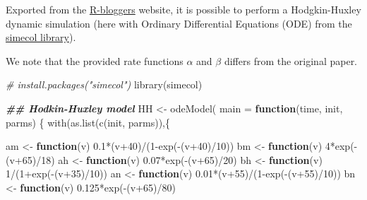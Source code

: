 \documentclass[
]{article}
\newenvironment{Shaded}{\begin{snugshade}}{\end{snugshade}}
\newcommand{\AttributeTok}[1]{\textcolor[rgb]{0.77,0.63,0.00}{#1}}
\newcommand{\CommentTok}[1]{\textcolor[rgb]{0.56,0.35,0.01}{\textit{#1}}}
\newcommand{\ControlFlowTok}[1]{\textcolor[rgb]{0.13,0.29,0.53}{\textbf{#1}}}
\newcommand{\DecValTok}[1]{\textcolor[rgb]{0.00,0.00,0.81}{#1}}
\newcommand{\DocumentationTok}[1]{\textcolor[rgb]{0.56,0.35,0.01}{\textbf{\textit{#1}}}}
\newcommand{\FloatTok}[1]{\textcolor[rgb]{0.00,0.00,0.81}{#1}}
\newcommand{\FunctionTok}[1]{\textcolor[rgb]{0.00,0.00,0.00}{#1}}
\newcommand{\NormalTok}[1]{#1}
\newcommand{\OtherTok}[1]{\textcolor[rgb]{0.56,0.35,0.01}{#1}}
\newcommand{\SpecialCharTok}[1]{\textcolor[rgb]{0.00,0.00,0.00}{#1}}
\begin{document}
Exported from the
\href{https://www.r-bloggers.com/2012/06/hodgkin-huxley-model-in-r/}{R-bloggers}
website, it is possible to perform a Hodgkin-Huxley dynamic simulation
(here with Ordinary Differential Equations (ODE) from the
\href{http://simecol.r-forge.r-project.org/}{simecol library}).

We note that the provided rate functions \(\alpha\) and \(\beta\)
differs from the original paper.

\begin{Shaded}
\begin{Highlighting}[]
\CommentTok{\# install.packages("simecol")}
\FunctionTok{library}\NormalTok{(simecol)}
\end{Highlighting}
\end{Shaded}

\begin{Shaded}
\begin{Highlighting}[]
\DocumentationTok{\#\# Hodkin{-}Huxley model}
\NormalTok{HH }\OtherTok{\textless{}{-}} \FunctionTok{odeModel}\NormalTok{(}
\AttributeTok{main =} \ControlFlowTok{function}\NormalTok{(time, init, parms) \{}
  \FunctionTok{with}\NormalTok{(}\FunctionTok{as.list}\NormalTok{(}\FunctionTok{c}\NormalTok{(init, parms)),\{}

\NormalTok{    am }\OtherTok{\textless{}{-}} \ControlFlowTok{function}\NormalTok{(v) }\FloatTok{0.1}\SpecialCharTok{*}\NormalTok{(v}\SpecialCharTok{+}\DecValTok{40}\NormalTok{)}\SpecialCharTok{/}\NormalTok{(}\DecValTok{1}\SpecialCharTok{{-}}\FunctionTok{exp}\NormalTok{(}\SpecialCharTok{{-}}\NormalTok{(v}\SpecialCharTok{+}\DecValTok{40}\NormalTok{)}\SpecialCharTok{/}\DecValTok{10}\NormalTok{))}
\NormalTok{    bm }\OtherTok{\textless{}{-}} \ControlFlowTok{function}\NormalTok{(v) }\DecValTok{4}\SpecialCharTok{*}\FunctionTok{exp}\NormalTok{(}\SpecialCharTok{{-}}\NormalTok{(v}\SpecialCharTok{+}\DecValTok{65}\NormalTok{)}\SpecialCharTok{/}\DecValTok{18}\NormalTok{)}
\NormalTok{    ah }\OtherTok{\textless{}{-}} \ControlFlowTok{function}\NormalTok{(v) }\FloatTok{0.07}\SpecialCharTok{*}\FunctionTok{exp}\NormalTok{(}\SpecialCharTok{{-}}\NormalTok{(v}\SpecialCharTok{+}\DecValTok{65}\NormalTok{)}\SpecialCharTok{/}\DecValTok{20}\NormalTok{)}
\NormalTok{    bh }\OtherTok{\textless{}{-}} \ControlFlowTok{function}\NormalTok{(v) }\DecValTok{1}\SpecialCharTok{/}\NormalTok{(}\DecValTok{1}\SpecialCharTok{+}\FunctionTok{exp}\NormalTok{(}\SpecialCharTok{{-}}\NormalTok{(v}\SpecialCharTok{+}\DecValTok{35}\NormalTok{)}\SpecialCharTok{/}\DecValTok{10}\NormalTok{))}
\NormalTok{    an }\OtherTok{\textless{}{-}} \ControlFlowTok{function}\NormalTok{(v) }\FloatTok{0.01}\SpecialCharTok{*}\NormalTok{(v}\SpecialCharTok{+}\DecValTok{55}\NormalTok{)}\SpecialCharTok{/}\NormalTok{(}\DecValTok{1}\SpecialCharTok{{-}}\FunctionTok{exp}\NormalTok{(}\SpecialCharTok{{-}}\NormalTok{(v}\SpecialCharTok{+}\DecValTok{55}\NormalTok{)}\SpecialCharTok{/}\DecValTok{10}\NormalTok{))}
\NormalTok{    bn }\OtherTok{\textless{}{-}} \ControlFlowTok{function}\NormalTok{(v) }\FloatTok{0.125}\SpecialCharTok{*}\FunctionTok{exp}\NormalTok{(}\SpecialCharTok{{-}}\NormalTok{(v}\SpecialCharTok{+}\DecValTok{65}\NormalTok{)}\SpecialCharTok{/}\DecValTok{80}\NormalTok{)}
    

\end{Highlighting}
\end{Shaded}
\end{document}
